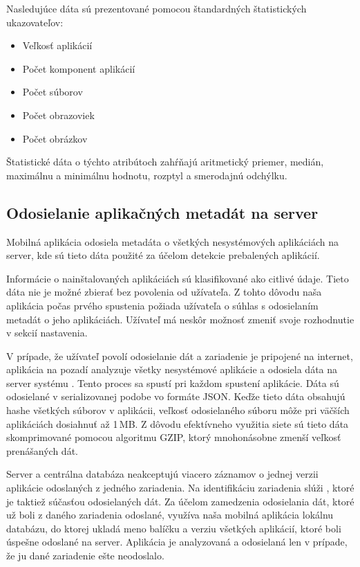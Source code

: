\noindent Nasledujúce dáta sú prezentované pomocou štandardných štatistických ukazovateľov:
\begin{itemize}
	\item Veľkosť aplikácií
	\item Počet komponent aplikácií
	\item Počet súborov
	\item Počet obrazoviek
	\item Počet obrázkov
\end{itemize}
Štatistické dáta o týchto atribútoch zahŕňajú aritmetický priemer, medián, maximálnu a minimálnu hodnotu, rozptyl a smerodajnú odchýlku. 

\subsection{Odosielanie aplikačných metadát na server}
Mobilná aplikácia odosiela metadáta o všetkých nesystémových aplikáciách na server, kde sú tieto dáta použité za účelom detekcie prebalených aplikácií.

Informácie o nainštalovaných aplikáciách sú klasifikované ako citlivé údaje. Tieto dáta nie je možné zbierať bez povolenia od užívateľa. Z tohto dôvodu naša aplikácia počas prvého spustenia požiada užívateľa o súhlas s odosielaním metadát o jeho aplikáciách. Užívateľ má neskôr možnosť zmeniť svoje rozhodnutie v sekcií nastavenia.

V prípade, že užívateľ povolí odosielanie dát a zariadenie je pripojené na internet, aplikácia na pozadí analyzuje všetky nesystémové aplikácie a odosiela dáta na server systému . Tento proces sa spustí pri každom spustení aplikácie. Dáta sú odosielané v serializovanej podobe vo formáte JSON. Keďže tieto dáta obsahujú hashe všetkých súborov v aplikácii, veľkosť odosielaného súboru môže pri väčších aplikáciách dosiahnuť až 1\,MB. Z dôvodu efektívneho využitia siete sú tieto dáta skomprimované pomocou algoritmu GZIP, ktorý mnohonásobne zmenší veľkosť prenášaných dát.

Server a centrálna databáza neakceptujú viacero záznamov o jednej verzii aplikácie odoslaných z jedného zariadenia. Na identifikáciu zariadenia slúži , ktoré je taktiež súčasťou odosielaných dát. Za účelom zamedzenia odosielania dát, ktoré už boli z daného zariadenia odoslané, využíva naša mobilná aplikácia lokálnu databázu, do ktorej ukladá meno balíčku a verziu všetkých aplikácií, ktoré boli úspešne odoslané na server. Aplikácia je analyzovaná a odosielaná len v prípade, že ju dané zariadenie ešte neodoslalo.

